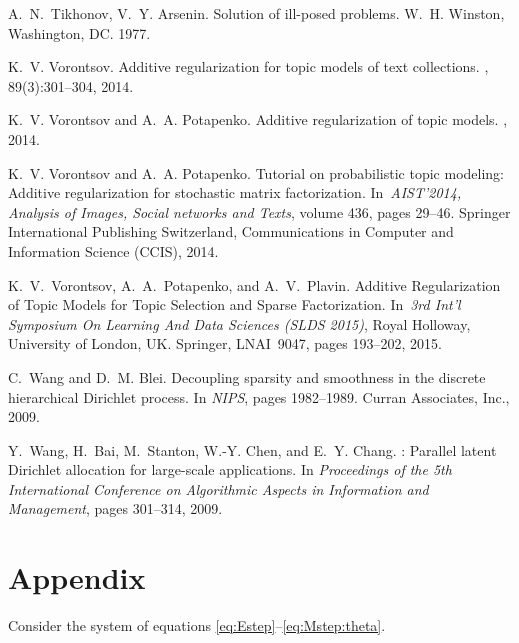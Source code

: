 \documentclass{acm_proc_article-sp}
\begin{document}
\begin{thebibliography}{10}
A.~N.~Tikhonov, V.~Y. Arsenin.
\newblock Solution of ill-posed problems.
\newblock W.~H. Winston, Washington, DC. 1977.

K.~V. Vorontsov.
\newblock Additive regularization for topic models of text collections.
, 89(3):301--304, 2014.

K.~V. Vorontsov and A.~A. Potapenko.
\newblock Additive regularization of topic models.
, 2014.

K.~V. Vorontsov and A.~A. Potapenko.
\newblock Tutorial on probabilistic topic modeling: Additive regularization for stochastic matrix factorization.
\newblock In~{\em AIST'2014, Analysis of Images, Social networks and Texts},
  volume 436, pages 29--46. Springer International Publishing Switzerland,
  Communications in Computer and Information Science (CCIS), 2014.

K.~V.~Vorontsov, A.~A.~Potapenko, and A.~V.~Plavin.
\newblock Additive Regularization of Topic Models for Topic Selection and Sparse Factorization.
\newblock In~{\em 3rd Int'l Symposium On Learning And Data Sciences (SLDS 2015)},
    Royal Holloway, University of London, UK.
    Springer, LNAI~9047, pages 193--202, 2015.

C.~Wang and D.~M. Blei.
\newblock Decoupling sparsity and smoothness in the discrete hierarchical Dirichlet process.
\newblock In {\em NIPS}, pages 1982--1989. Curran Associates, Inc., 2009.

Y.~Wang, H.~Bai, M.~Stanton, W.-Y. Chen, and E.~Y. Chang.
: Parallel latent {D}irichlet allocation for large-scale applications.
\newblock In {\em Proceedings of the 5th International Conference on
  Algorithmic Aspects in Information and Management}, pages 301--314, 2009.

\end{thebibliography}

\section*{Appendix}

Consider the system of equations \eqref{eq:Estep}--\eqref{eq:Mstep:theta}.
\end{document}
